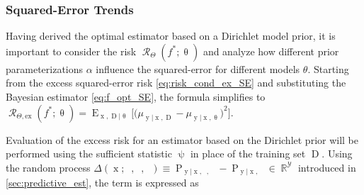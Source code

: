 \documentclass[12pt]{report}
\DeclareMathOperator{\xrm}{\mathrm{x}}
\DeclareMathOperator{\yrm}{\mathrm{y}}
\DeclareMathOperator{\Drm}{\mathrm{D}}
\DeclareMathOperator{\Prm}{\mathrm{P}}
\DeclareMathOperator{\Erm}{\mathrm{E}}
\DeclareMathOperator{\Ycal}{\mathcal{Y}}
\DeclareMathOperator{\Rcal}{\mathcal{R}}
\DeclareMathOperator{\Rbb}{\mathbb{R}}
\DeclareMathOperator{\upthetac}{\uptheta_\text{c}}
\DeclareMathOperator{\uppsim}{\uppsi_\text{m}}
\DeclareMathOperator{\uppsic}{\uppsi_\text{c}}
\begin{document}
\subsubsection{Squared-Error Trends}

Having derived the optimal estimator based on a Dirichlet model prior, it is important to consider the risk $\Rcal_{\Theta}(f^* ; \uptheta)$ and analyze how different prior parameterizations $\alpha$ influence the squared-error for different models $\theta$. Starting from the excess squared-error risk \eqref{eq:risk_cond_ex_SE} and substituting the Bayesian estimator \eqref{eq:f_opt_SE}, the formula simplifies to $\Rcal_{\Theta, \mathrm{ex}}(f^* ; \uptheta) = \Erm_{\xrm,\Drm | \uptheta} \Big[ \big( \mu_{\yrm | \xrm,\Drm} - \mu_{\yrm | \xrm,\uptheta} \big)^2 \Big]$.

Evaluation of the excess risk for an estimator based on the Dirichlet prior will be performed using the sufficient statistic $\uppsi$ in place of the training set $\Drm$. Using the random process $\Delta(\xrm;\uppsim,\uppsic,\upthetac) \equiv \Prm_{\yrm | \xrm,\uppsim,\uppsic} - \Prm_{\yrm | \xrm,\upthetac} \in \Rbb^{\Ycal}$ introduced in \ref{sec:predictive_est}, the term is expressed as
\end{document}
